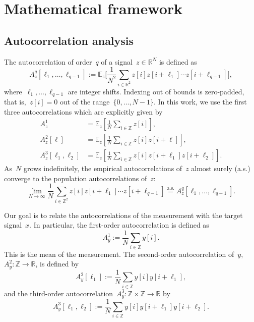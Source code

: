 \documentclass{article}
\newcommand{\asafc}[1]{{\color{blue}{[Asaf: #1]}}}
\begin{document}
\section{Mathematical framework}
\label{sec:math}
\subsection{Autocorrelation analysis}
\label{subsec:ac}
The autocorrelation of order~$q$ of a signal~\mbox{$z \in \mathbb{R}^{N}$} is defined as
\begin{equation}
A_z^q[\ell_1, \ldots, \ell_{q-1}] := \mathbb{E}_z\Big[\frac{1}{N^2} \sum_{i \in \mathbb{R}^2} z[i] z[i + \ell_1] \cdots z[i + \ell_{q-1}]\Big],
\end{equation}
\asafc{Why $N^2$?}where~$\ell_1, \ldots, \ell_{q-1}$ are integer shifts. Indexing out of bounds is zero-padded, that is,~\mbox{$z[i] = 0$} out of the range~\mbox{$\{0, \ldots, {N-1}\}$}. In this work, we use the first three autocorrelations which are explicitly given by
\begin{align}
\label{eq:ac1}
A_z^1 &= \mathbb{E}_z \left[\frac{1}{N} \sum_{i \in \mathbb{Z}} z\left[i\right] \right], \\
\label{eq:ac2}
A_z^2\left[\ell\right] &= \mathbb{E}_z \left[\frac{1}{N} \sum_{i \in \mathbb{Z}} z\left[i\right] z\left[i + \ell\right] \right], \\
\label{eq:ac3}
A_z^3\left[\ell_1, \ell_2\right] &= \mathbb{E}_z \left[\frac{1}{N} \sum_{i \in \mathbb{Z}} z\left[i\right] z\left[i + \ell_1\right] z\left[i + \ell_2\right] \right].
\end{align}
As~$N$ grows indefinitely, the empirical autocorrelations of~$z$ almost surely (a.s.) converge to the population autocorrelations of~$z$:
\begin{equation}
\lim_{N \rightarrow \infty} \frac{1}{N} \sum_{i \in \mathbb{Z}^2} z[i] z[i + \ell_1] \cdots z[i + \ell_{q-1}] \stackrel{\text{a.s.}}{=}A_z^q[\ell_1, \ldots, \ell_{q-1}].
\end{equation}

Our goal is to relate the autocorrelations of the measurement with the target signal~$x$. In particular, the first-order autocorrelation is defined as
\begin{equation}
\label{eq:AM1}
A_{y}^1 := \frac{1}{N} \sum_{i \in \mathbb{Z}} y[i].
\end{equation}
This is the mean of the measurement. The second-order autocorrelation of~$y$, \mbox{$A_{y}^2: \mathbb{Z} \rightarrow \mathbb{R}$}, is defined by
\begin{equation}
\label{eq:AM2}
A_{y}^2 [\ell_1] := \frac{1}{N} \sum_{i \in \mathbb{Z}} y[i] y[i + \ell_1],
\end{equation}
and the third-order autocorrelation~\mbox{$A_{y}^3: \mathbb{Z} \times \mathbb{Z} \rightarrow \mathbb{R}$} by
\begin{equation}
\label{eq:AM3}
A_{y}^3 [\ell_1, \ell_2] := \frac{1}{N} \sum_{i \in \mathbb{Z}} y[i] y[i + \ell_1] y[i + \ell_2].
\end{equation}
\end{document}
